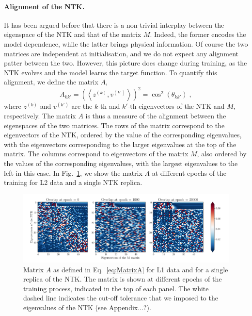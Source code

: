 \paragraph{Alignment of the NTK.}
It has been argued before that there is a non-trivial interplay between the
eigenspace of the NTK and that of the matrix $M$. Indeed, the former encodes the
model dependence, while the latter brings physical information. Of course the
two matrices are independent at initialisation, and we do not expect any
alignment patter between the two. However, this picture does change during
training, as the NTK evolves and the model learns the target function. To
quantify this alignment, we define the matrix $A$, 
\begin{equation}
  \label{eq:MatrixA}
  A_{kk'} = \left( \left< z^{(k)}, v^{(k')}\right> \right)^2 = \cos^2(\theta_{kk'}) \;,
\end{equation}
where $z^{(k)}$ and $v^{(k')}$ are the $k$-th and $k'$-th eigenvectors of the
NTK and $M$, respectively. The matrix $A$ is thus a measure of the alignment
between the eigenspaces of the two matrices. The rows of the matrix correspond to 
the eigenvectors of the NTK, ordered by the value of the corresponding eigenvalues, 
with the eigenvectors corresponding to the larger 
eigenvalues at the top of the matrix. The columns correspond to eigenvectors 
of the matrix $M$, also ordered by the values of the corresponding eigenvalues, 
with the largest eigenvalues to the left in this case. In Fig.~\ref{fig:NtkMAlign}, we
show the matrix $A$ at different epochs of the training for L2 data and a
single NTK replica. 
\begin{figure}[ht!]
  \centering
  \includegraphics[width=1\textwidth]{plots/ntk_pheno/ntk_alignment.pdf}
  \caption{Matrix $A$ as defined in Eq.~\eqref{eq:MatrixA} for L1 data and for a
  single replica of the NTK. The matrix is shown at different epochs of the
  training process, indicated in the top of each panel. The white dashed line
  indicates the cut-off tolerance that we imposed to the eigenvalues of the NTK
  (see Appendix...?).}
  \label{fig:NtkMAlign}
\end{figure}
